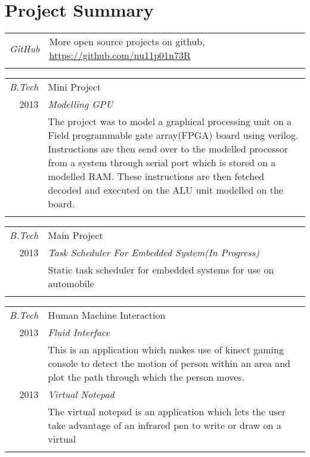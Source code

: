 \documentclass[a4paper]{article}
\begin{document}
\section{Project Summary}
\begin{tabular}{r|p{15cm}}
    \emph{GitHub}  & More open source projects on github, \normalsize{\url{https://github.com/nu11p01n73R}} \\
    \multicolumn{2}{c}{}\ %
\end{tabular}

\begin{tabular}{r|p{15cm}}
    \emph{B.Tech} & Mini Project \\
    \textsc{2013} & \emph{Modelling GPU} \\
    & \normalsize{The project was to model a graphical processing unit on a Field programmable gate array(FPGA) board using verilog. Instructions are then send over to the modelled processor from a system through serial port which is stored on a modelled RAM. These instructions are then fetched decoded and executed on the ALU unit modelled on the board.}\\
    \multicolumn{2}{c}{}\ %
\end{tabular}

\begin{tabular}{r|p{15cm}}
    \emph{B.Tech} & Main Project \\
    \textsc{2013} & \emph{Task Scheduler For Embedded System(In Progress)} \\
    & \normalsize{Static task scheduler for embedded systems for use on automobile}\\
    \multicolumn{2}{c}{} %
\end{tabular}

\begin{tabular}{r|p{15cm}}
    \emph{B.Tech} & Human Machine Interaction \\
    \textsc{2013} & \emph{Fluid Interface} \\
    & \normalsize{This is an application which makes use of kinect gaming console to detect the motion of person within an area and plot the path through which the person moves.}\\

    \textsc{2013} & \emph{Virtual Notepad} \\
    & \normalsize{The virtual notepad is an application which lets the user take advantage of an infrared pen to write or draw on a virtual}\\
    \multicolumn{2}{c}{}\ %
\end{tabular}
\end{document}
